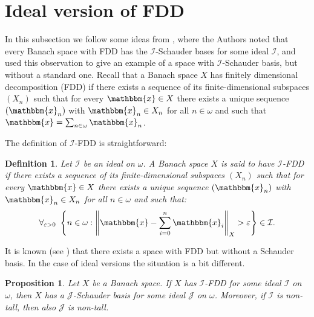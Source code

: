 \documentclass{amsart}
\newcommand{\I}{\mathcal{I}}
\newcommand{\J}{\mathcal{J}}
\newcommand{\w}{\mathbbm}
\newtheorem{definition}[theorem]{Definition}
\newtheorem{proposition}[theorem]{Proposition}
\begin{document}
\section{Ideal version of FDD}

In this subsection we follow some ideas from \cite{ARTT}, where the Authors noted that every Banach space with FDD has the $\I$-Schauder bases for some ideal $\I$, and used this observation to give an example of a space with $\I$-Schauder basis, but without a standard one. Recall that a Banach space $X$ has finitely dimensional decomposition (FDD) if there exists a sequence of its finite-dimensional subspaces $(X_n)$ such that for every $\w{x} \in X$ there exists a unique sequence $(\w{x}_n)$ with $\w{x}_n \in X_n$ for all $n \in \omega$ and such that $\w{x}=\sum_{n \in \omega} \w{x}_n$.

The definition of $\I$-FDD is straightforward:
\begin{definition}
Let $\I$ be an ideal on $\omega$. A Banach space $X$ is said to have $\I$-FDD if there exists a sequence of its finite-dimensional subspaces $(X_n)$ such that for every $\w{x} \in X$ there exists a unique sequence $(\w{x}_n)$ with $\w{x}_n \in X_n$ for all $n \in \omega$ and such that:
\[
\forall_{\varepsilon>0}\ \left\{n\in\omega:\left\|\w{x}-\sum_{i=0}^n \w{x}_i\right\|_X>\varepsilon\right\}\in\I.
\]
\end{definition}

It is known (see \cite{Szar}) that there exists a space with FDD but without a Schauder basis. In the case of ideal versions the situation is a bit different.

\begin{proposition}
\label{FDDprop1}
Let $X$ be a Banach space. If $X$ has $\I$-FDD for some ideal $\I$ on $\omega$, then $X$ has a $\J$-Schauder basis for some ideal $\J$ on $\omega$. Moreover, if $\I$ is non-tall, then also $\J$ is non-tall.
\end{proposition}
\end{document}
